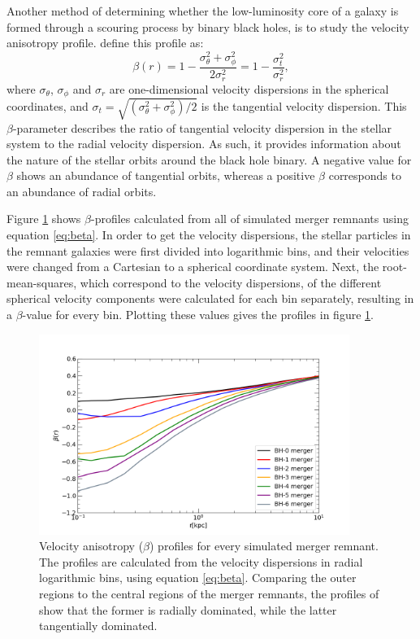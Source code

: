 \documentclass[english, twoside]{HYgradu}
\begin{document}
Another method of determining whether the low-luminosity core of a galaxy is formed through a scouring process by binary black holes, is to study the velocity anisotropy profile. \cite{BinneyTremaine} define this profile as:
\begin{equation}
\beta(r) = 1 - \frac{\sigma_\theta^2 + \sigma_\phi^2}{2\sigma_r^2} = 1 - \frac{\sigma_t^2}{\sigma_r^2}, \label{eq:beta}
\end{equation}
where $\sigma_\theta$, $\sigma_\phi$ and $\sigma_r$ are one-dimensional velocity dispersions in the spherical coordinates, and $\sigma_t = \sqrt{(\sigma_\theta^2 + \sigma_\phi^2) / 2}$ is the tangential velocity dispersion. This $\beta$-parameter describes the ratio of tangential velocity dispersion in the stellar system to the radial velocity dispersion. As such, it provides information about the nature of the stellar orbits around the black hole binary. A negative value for $\beta$ shows an abundance of tangential orbits, whereas a positive $\beta$ corresponds to an abundance of radial orbits. 

Figure \ref{figure:beta_no_rb} shows $\beta$-profiles calculated from all of simulated merger remnants using equation \ref{eq:beta}. In order to get the velocity dispersions, the stellar particles in the remnant galaxies were first divided into logarithmic bins, and their velocities were changed from a Cartesian to a spherical coordinate system. Next, the root-mean-squares, which correspond to the velocity dispersions, of the different spherical velocity components were calculated for each bin separately, resulting in a $\beta$-value for every bin. Plotting these values gives the profiles in figure \ref{figure:beta_no_rb}. 

\begin{figure}
	\centering
	\includegraphics[width=0.9\textwidth]{beta_no_rb.png}
	\caption{Velocity anisotropy ($\beta$) profiles for every simulated merger remnant. The profiles are calculated from the velocity dispersions in radial logarithmic bins, using equation \ref{eq:beta}. Comparing the outer regions to the central regions of the merger remnants, the profiles of show that the former is radially dominated, while the latter tangentially dominated.}
	\label{figure:beta_no_rb}
\end{figure}
\end{document}
